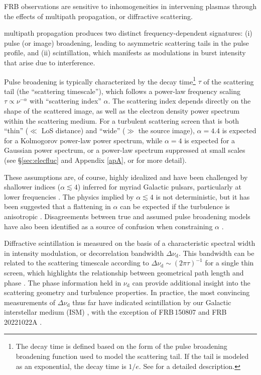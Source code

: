 \documentclass[twocolumn, linenumbers, tra]{aastex631}
\begin{document}
FRB observations are sensitive to inhomogeneities in intervening plasmas through the effects of multipath propagation, or {diffractive} scattering. {multipath propagation produces two distinct frequency-dependent signatures: (i) pulse (or image) broadening, leading to asymmetric scattering tails in the pulse profile, and (ii) scintillation, which manifests as modulations in burst intensity that arise due to interference. 

Pulse broadening is typically characterized by the decay time\footnote{The decay time is defined based on the form of the pulse broadening broadening function used to model the scattering tail. If the tail is modeled as an exponential, the decay time is $1/e$. See \citet{Geiger2024} for a detailed description.} $\tau$ of the scattering tail (the ``scattering timescale''), which follows a power-law frequency scaling $\tau \propto \nu^{-\alpha}$ with ``scattering index'' $\alpha$. The scattering index depends directly on the shape of the scattered image, as well as the electron density power spectrum within the scattering medium. For a turbulent scattering screen that is both ``thin'' ($\ll$ LoS distance) and ``wide'' ($\gg$ the source image), $\alpha = 4.4$ is expected for a Kolmogorov power-law power spectrum, while $\alpha = 4$ is expected for a Gaussian power spectrum, or a power-law spectrum suppressed at small scales (see \S\ref{sec:elecfluc} and Appendix \ref{apA}, or \citet{Rickett1977} for more detail).

These assumptions are, of course, highly idealized and have been challenged by shallower indices ($\alpha \lesssim 4$) inferred for myriad Galactic pulsars, particularly at lower frequencies \citep{Lohmer2001, Deneva2009, Geyer2016, Dexter2017}. The physics implied by $\alpha \lesssim 4$ is not deterministic, but it has been suggested that a flattening in $\alpha$ can be expected if the turbulence is anisotropic \citep{Tuntsov2013}. Disagreements between true and assumed pulse broadening models have also been identified as a source of confusion when constraining $\alpha$ \citep{Geiger2024}.}

Diffractive scintillation is measured on the basis of a characteristic spectral width in intensity modulation, or decorrelation bandwidth $\Delta \nu_{\mathrm{d}}$. This bandwidth can be related to the scattering timescale according to $\Delta \nu_{\mathrm{d}} \sim (2 \pi \tau)^{-1}$ for a single thin screen, which highlights the relationship between geometrical path length and phase \citep[][]{Sutton1971}. The phase information held in $\nu_{\mathrm{d}}$ can provide additional insight into the scattering geometry and turbulence properties. In practice, the most convincing measurements of $\Delta \nu_{\mathrm{d}}$ thus far have indicated scintillation by our Galactic interstellar medium (ISM) \citep{Masui2015, Gajjar2018, Hessels2019, Marcote2020, Bhandari2020, Schoen2021, Ocker2022a, Sammons2023}, with the exception of FRB\,150807 \citep{Ravi2016} and FRB\,20221022A \citep{Nimmo2025}. 
\end{document}

